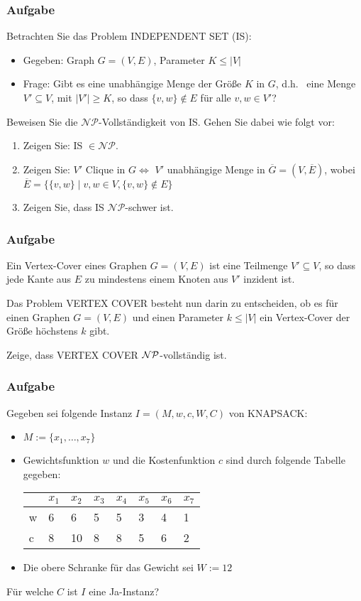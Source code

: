 \documentclass{beamer}
\begin{document}
\begin{frame}
\frametitle{Aufgabe}
Betrachten Sie das Problem INDEPENDENT SET (IS):

\begin{itemize}
 \item Gegeben: Graph $G=(V, E)$, Parameter $K \leq |V|$
 \item Frage: Gibt es eine unabhängige Menge der Größe $K$ in $G$, d.h.~ eine Menge $V' \subseteq V$, mit $|V'| \geq K$, so dass $\{v, w\} \notin E$ für alle $v, w \in V'$? 
\end{itemize}
Beweisen Sie die $\mathcal{NP}$-Vollständigkeit von IS. Gehen Sie dabei wie folgt vor:
\begin{enumerate}
 \item Zeigen Sie: IS $\in \mathcal{NP}$.
 \item Zeigen Sie: $V'$ Clique in $G \Longleftrightarrow$ $V'$ unabhängige Menge in $\overline{G}=(V, \overline{E})$, wobei \\
$\overline{E}= \{\{v, w\} \mid v, w \in V, \{v, w\} \notin E\}$
 \item Zeigen Sie, dass IS $\mathcal{NP}$-schwer ist.
\end{enumerate}
\end{frame}

\begin{frame}
\frametitle{Aufgabe}
Ein Vertex-Cover eines Graphen $G=(V,E)$ ist eine Teilmenge $V'\subseteq V$, so
dass jede Kante aus $E$ zu mindestens einem Knoten aus $V'$ inzident ist.

Das Problem \textsc{VERTEX COVER} besteht nun darin zu entscheiden, ob es
für einen Graphen $G=(V,E)$ und einen Parameter $k \leq |V|$ ein Vertex-Cover
der Größe höchstens $k$ gibt.

Zeige, dass \textsc{VERTEX COVER} $\cal{NP}$-vollständig ist. 
\end{frame}

\begin{frame}
\frametitle{Aufgabe}
Gegeben sei folgende Instanz $I=(M, w, c, W, C)$ von KNAPSACK:

\begin{itemize}
\item $M := \{x_1, \ldots, x_7\}$
\item Gewichtsfunktion $w$ und die Kostenfunktion $c$ sind durch folgende Tabelle gegeben:

\begin{center}
\begin{tabular}{l|l|l|l|l|l|l|l}
	  &$x_1$ &$x_2$ &$x_3$ 	&$x_4$ 	&$x_5$ 	&$x_6$ 	&$x_7$\\ 	
  \hline
	w &6	 &6	&5	&5	&3	&4	&1\\
  \hline
	c &8	 &10	&8	&8	&5	&6	&2\\
\end{tabular}
\end{center}
\item Die obere Schranke für das Gewicht sei $W:=12$
\end{itemize}

Für welche $C$ ist $I$ eine Ja-Instanz?  
\end{frame}
\end{document}
